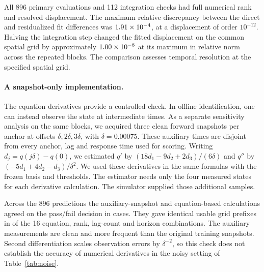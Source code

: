 All 896 primary evaluations and 112 integration checks had full numerical rank and resolved displacement. The maximum relative discrepancy between the direct and residualized fit differences was $1.91\times10^{-4}$, at a displacement of order $10^{-12}$. Halving the integration step changed the fitted displacement on the common spatial grid by approximately $1.00\times10^{-8}$ at its maximum in relative norm across the repeated blocks. The comparison assesses temporal resolution at the specified spatial grid.

\paragraph{A snapshot-only implementation.}
The equation derivatives provide a controlled check. In offline identification, one can instead observe the state at intermediate times. As a separate sensitivity analysis on the same blocks, we acquired three clean forward snapshots per anchor at offsets $\delta,2\delta,3\delta$, with $\delta=0.00075$. These auxiliary times are disjoint from every anchor, lag and response time used for scoring. Writing $d_j=q(j\delta)-q(0)$, we estimated $q'$ by $(18d_1-9d_2+2d_3)/(6\delta)$ and $q''$ by $(-5d_1+4d_2-d_3)/\delta^2$. We used these derivatives in the same formulas with the frozen basis and thresholds. The estimator needs only the four measured states for each derivative calculation. The simulator supplied those additional samples.

Across the 896 predictions the auxiliary-snapshot and equation-based calculations agreed on the pass/fail decision in \SnapshotAgreement{} cases. They gave identical usable grid prefixes in \SnapshotSame{} of the 16 equation, rank, lag-count and horizon combinations. The auxiliary measurements are clean and more frequent than the original training snapshots. Second differentiation scales observation errors by $\delta^{-2}$, so this check does not establish the accuracy of numerical derivatives in the noisy setting of Table~\ref{tab:noise}.
